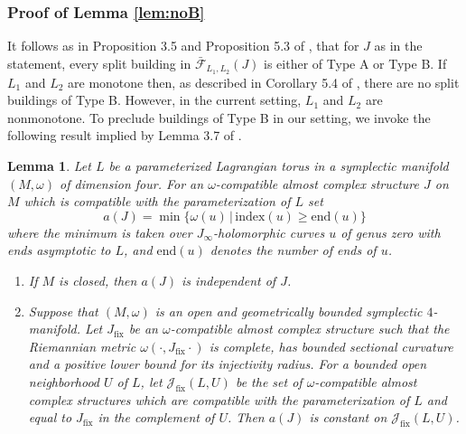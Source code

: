 \documentclass[12pt]{amsart}
\newtheorem{lemma}[theorem]{Lemma}
\theoremstyle{definition}
\begin{document}
\subsubsection{Proof of Lemma \ref{lem:noB}}
It follows as in Proposition 3.5 and Proposition 5.3 of \cite{rgi}, that for $J$ as in the statement, every split building in 
$\bar{\mathcal{F}}_{L_1,L_2}(J)$ is either of Type A or Type B. If $L_1$ and $L_2$ are monotone then, as described in Corollary 5.4 of \cite{rgi}, there are no split buildings of Type B. However, in the current setting, $L_1$ and $L_2$ are nonmonotone. 
To preclude buildings of Type B in our setting, we invoke the following result implied by Lemma 3.7 of \cite{ho}.

\begin{lemma}\label{>r2} Let $L$ be a parameterized Lagrangian torus in a symplectic manifold $(M,\omega)$ of dimension four. For an $\omega$-compatible almost complex structure $J$ on $M$ which is compatible with the parameterization of $L$ set $$a(J) = \min\{  \omega(u) \, | \, \mathrm{index}(u) \ge \mathrm{end}(u) \}$$
where the minimum is taken over $J_{\infty}$-holomorphic curves $u$ of genus zero with ends asymptotic to $L$, and $\mathrm{end}(u)$ denotes the number of ends of $u$.

\begin{enumerate}
\item If $M$ is closed, then $a(J)$ is independent of $J$.\\

\item Suppose that $(M,\omega)$ is an open and  geometrically bounded symplectic $4$-manifold. Let $J_{\mathrm{fix}}$ be an $\omega$-compatible almost complex structure such that the Riemannian metric $\omega(\cdot, J_{\mathrm{fix}} \cdot )$ is complete, has bounded sectional curvature and a positive lower bound for its injectivity radius. For a bounded open neighborhood $U$ of $L$, let $\mathcal{J}_{\mathrm{fix}} (L,U)$ be the set of $\omega$-compatible almost complex structures which are compatible with the parameterization of $L$ and equal to  $J_{\mathrm{fix}}$ in the complement of $U$. Then $a(J)$ is constant on $\mathcal{J}_{\mathrm{fix}} (L,U)$.
\end{enumerate}



\end{lemma}
\end{document}
